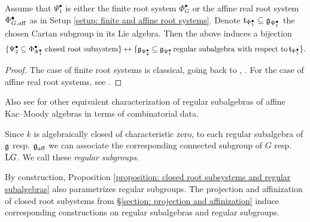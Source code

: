 \begin{proposition}\label{proposition: closed root subsystems and regular subalgebras}
Assume that $\Psi^{\bullet}_1$ is either the finite root system $\Phi^{\bullet}_G$ or the affine real root system $\Phi^{\bullet}_{G, \mathrm{aff}}$ as in Setup \ref{setup: finite and affine root systems}. Denote $\operatorname{\mathfrak{t}}_{\Psi^{\bullet}_1} \subseteq \operatorname{\mathfrak{g}}_{\Psi^{\bullet}_1}$ the chosen Cartan subgroup in its Lie algebra. Then the above induces a bijection
    \begin{equation*}
    \{ \Psi^{\bullet}_2 \subseteq \Phi^{\bullet}_{\Psi^{\bullet}_1} \ \text{closed root subsystem}  \} \leftrightarrow \{ \operatorname{\mathfrak{g}}_{\Psi^{\bullet}_2} \subseteq \operatorname{\mathfrak{g}}_{\Psi^{\bullet}_1}  \text{regular subalgebra with respect to} \operatorname{\mathfrak{t}}_{\Psi^{\bullet}_1} \}.
\end{equation*}
\end{proposition}
\begin{proof}
The case of finite root systems is classical, going back to \cite{Dyn57}, \cite{BD49}. For the case of affine real root systems, see \cite[Corollary 12.1.5]{RV19}.
\end{proof}



Also see \cite[Theorem 12.3.1]{RV19} for other equivalent characterization of regular subalgebras of affine Kac--Moody algebras in terms of combinatorial data.

\begin{notation}
Since $k$ is algebraically closed of characteristic zero, to each regular subalgebra of $\operatorname{\mathfrak{g}}$ resp. $\operatorname{\mathfrak{g}}_{\mathrm{aff}}$ we can associate the corresponding connected subgroup of $G$ resp. $\mathrm{L} G$.
We call these \emph{regular subgroups}.
\end{notation}

By construction, Proposition \ref{proposition: closed root subsystems and regular subalgebras} also parametrizes regular subgroups. The projection and affinization of closed root subystems from \S \ref{section: projection and affinization} induce corresponding constructions on regular subalgebras and regular subgroups.







